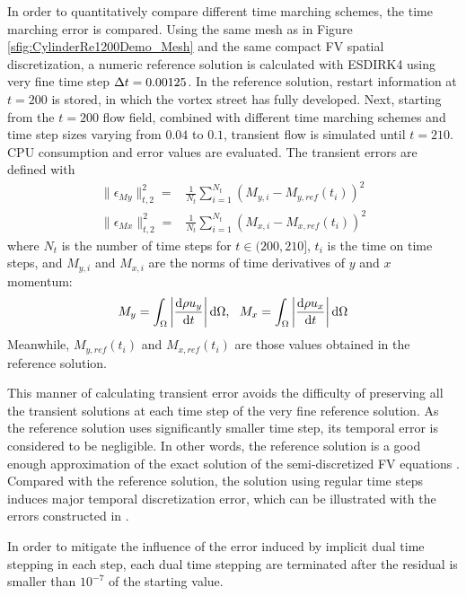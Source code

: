 In order to quantitatively compare different
time marching schemes,
the time marching error is compared.
Using the same mesh as in Figure \ref{sfig:CylinderRe1200Demo_Mesh}
and the same compact FV spatial  discretization,
a numeric reference solution is calculated with ESDIRK4 using
very fine time step $\mathrm\Delta t = 0.00125$.
In the reference solution, restart information at $t=200$
is stored, in which the vortex street has fully developed.
Next, starting from the $t=200$ flow field, combined with
different time marching schemes and time step sizes
varying from $0.04$ to $0.1$, transient flow is simulated until $t=210$.
CPU consumption and error values are evaluated.
The transient errors are defined with
\begin{equation}
    \begin{aligned}
        \|\epsilon_{My}\|_{t,2}^2
        = & \frac{1}{N_{t}}\sum_{i=1}^{N_t}{(M_{y,i}-M_{y,ref}(t_i))^2} \\
        \|\epsilon_{Mx}\|_{t,2}^2
        = & \frac{1}{N_{t}}\sum_{i=1}^{N_t}{(M_{x,i}-M_{x,ref}(t_i))^2}
    \end{aligned}
    \label{eq:vorstreetErr}
\end{equation}
where $N_{t}$ is the number of time steps for $t\in(200,210]$,
$t_i$ is the time on time steps, and $M_{y,i}$ and $M_{x,i}$ are
the norms of time derivatives of $y$ and $x$ momentum:
\begin{equation}
    M_y = \int_{\Omega}{\left|\derivative{\rho u_y}{t}\right| \dd \Omega},\ \
    M_x = \int_{\Omega}{\left|\derivative{\rho u_x}{t}\right| \dd \Omega}
\end{equation}
Meanwhile, $M_{y,ref}(t_i)$ and $M_{x,ref}(t_i)$ are those values
obtained in the reference solution.

This manner of calculating transient error avoids the difficulty
of preserving all the transient solutions at each time step of
the very fine reference solution.
As the reference solution uses significantly smaller time step,
its temporal error is considered to be negligible.
In other words, the reference solution is a good enough
approximation of the exact solution of the semi-discretized
FV equations .
Compared with the reference
solution, the solution using regular time steps
induces major temporal discretization error, which can
be illustrated with the errors constructed in .

In order to mitigate the influence of the error induced
by implicit dual time stepping in each step,
each dual time stepping are terminated after
the residual is smaller than $10^{-7}$ of the
starting value.

